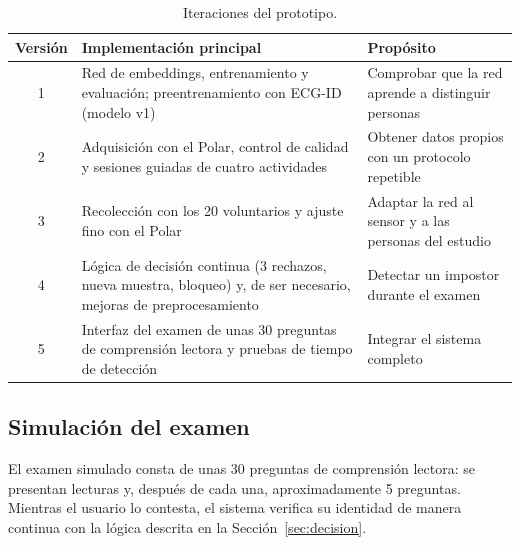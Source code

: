 \begin{table}[htbp]
\centering
\caption{Iteraciones del prototipo.}
\label{tab:iteraciones}
\small
\begin{tabularx}{\textwidth}{c X X}
\toprule
\textbf{Versión} & \textbf{Implementación principal} & \textbf{Propósito} \\
\midrule
1 & Red de embeddings, entrenamiento y evaluación; preentrenamiento con ECG-ID (modelo v1) & Comprobar que la red aprende a distinguir personas \\
2 & Adquisición con el Polar, control de calidad y sesiones guiadas de cuatro actividades & Obtener datos propios con un protocolo repetible \\
3 & Recolección con los 20 voluntarios y ajuste fino con el Polar & Adaptar la red al sensor y a las personas del estudio \\
4 & Lógica de decisión continua (3 rechazos, nueva muestra, bloqueo) y, de ser necesario, mejoras de preprocesamiento & Detectar un impostor durante el examen \\
5 & Interfaz del examen de unas 30 preguntas de comprensión lectora y pruebas de tiempo de detección & Integrar el sistema completo \\
\bottomrule
\end{tabularx}
\end{table}


\subsection{Simulación del examen}

El examen simulado consta de unas 30 preguntas de comprensión lectora: se presentan lecturas y, después de cada una, aproximadamente 5 preguntas. Mientras el usuario lo contesta, el sistema verifica su identidad de manera continua con la lógica descrita en la Sección~\ref{sec:decision}. 
